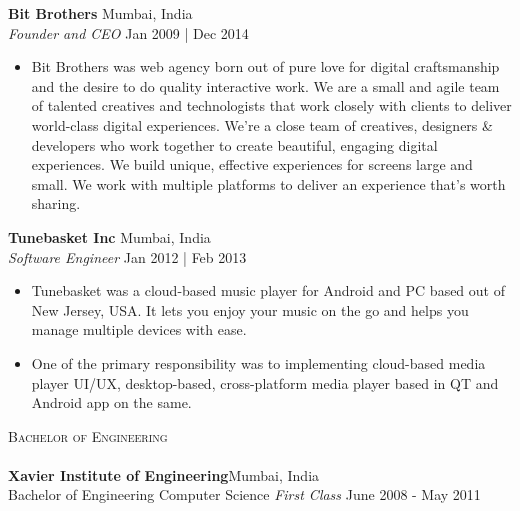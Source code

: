 \documentclass[a4paper]{article}
\newcommand{\lineunder} {
    \vspace*{-8pt} \\
    \hspace*{-18pt} \hrulefill \\
}
\newcommand{\header} [1] {
    {\hspace*{-18pt}\vspace*{6pt} \textsc{#1}}
    \vspace*{-6pt} \lineunder
}
\begin{document}
\textbf{Bit Brothers} \hfill Mumbai, India\\
\textit{Founder and CEO} \hfill Jan 2009 | Dec 2014\\
\vspace{-1mm}
\begin{itemize} \itemsep 1pt
	\item Bit Brothers was web agency born out of pure love for digital craftsmanship and the desire to do quality interactive work. We are a small and agile team of talented creatives and technologists that work closely with clients to deliver world-class digital experiences. We’re a close team of creatives, designers \& developers who work together to create beautiful, engaging digital experiences. We build unique, effective experiences for screens large and small. We work with multiple platforms to deliver an experience that’s worth sharing.
\end{itemize}
\textbf{Tunebasket Inc} \hfill Mumbai, India\\
\textit{Software Engineer} \hfill Jan 2012 | Feb 2013\\
\vspace{-1mm}
\begin{itemize} \itemsep 1pt
	\item Tunebasket was a cloud-based music player for Android and PC based out of New Jersey, USA. It lets you enjoy your music on the go and helps you manage multiple devices with ease.
	\item One of the primary responsibility was to implementing cloud-based media player UI/UX, desktop-based, cross-platform media player based in QT and Android app on the same.
\end{itemize}

\header{Bachelor of Engineering}
\textbf{Xavier Institute of Engineering}\hfill Mumbai, India\\
Bachelor of Engineering Computer Science \textit{First Class} \hfill June 2008 - May 2011\\
\vspace{2mm}
\end{document}
